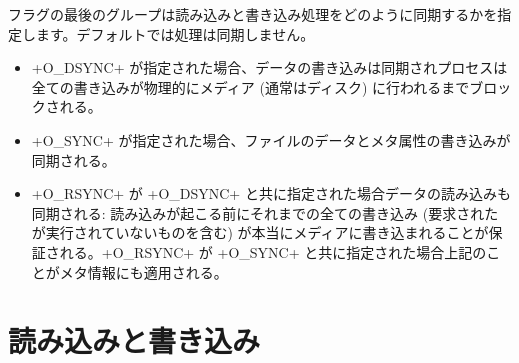 フラグの最後のグループは読み込みと書き込み処理をどのように同期するかを指定します。デフォルトでは処理は同期しません。
\begin{itemize}
\item \ml+O_DSYNC+ が指定された場合、データの書き込みは同期されプロセスは全ての書き込みが物理的にメディア (通常はディスク) に行われるまでブロックされる。
%
\item \ml+O_SYNC+ が指定された場合、ファイルのデータとメタ属性の書き込みが同期される。
%
  \item \ml+O_RSYNC+ が \ml+O_DSYNC+ と共に指定された場合データの読み込みも同期される:  読み込みが起こる前にそれまでの全ての書き込み (要求されたが実行されていないものを含む) が本当にメディアに書き込まれることが保証される。\ml+O_RSYNC+ が \ml+O_SYNC+ と共に指定された場合上記のことがメタ情報にも適用される。
\end{itemize}


\section{読み込みと書き込み}

